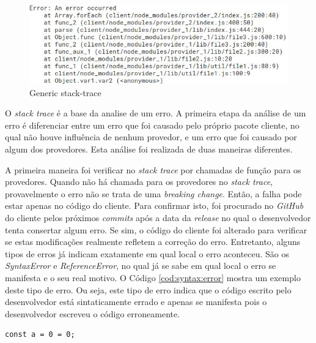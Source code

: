 \begin{figure}
    \centering
    \includegraphics[scale=0.7]{figuras/stack_trace.jpeg}
    \caption{Generic stack-trace}
    \label{fig:trace}
\end{figure}{}

O \textit{stack trace} é a base da analise de um erro. A primeira etapa da análise de um erro é diferenciar entre um erro que foi causado pelo próprio pacote cliente, no qual não houve influência de nenhum provedor, e um erro que foi causado por algum dos provedores. Esta análise foi realizada de duas maneiras diferentes.

A primeira maneira foi verificar no \textit{stack trace} por chamadas de função para os provedores. Quando não há chamada para os provedores no \textit{stack trace}, provavelmente o erro não se trata de uma \textit{breaking change}. Então, a falha pode estar apenas no código do cliente. Para confirmar isto, foi procurado no \textit{GitHub} do cliente pelos próximos \textit{commits} após a data da \textit{release} no qual o desenvolvedor tenta consertar algum erro. Se sim, o código do cliente foi alterado para verificar se estas modificações realmente refletem a correção do erro. Entretanto, alguns tipos de erros já indicam exatamente em qual local o erro aconteceu. São os \textit{SyntaxError} e \textit{ReferenceError}, no qual já se sabe em qual local o erro se manifesta e o seu real motivo. O Código \ref{cod:syntax:error} mostra um exemplo deste tipo de erro. Ou seja, este tipo de erro indica que o código escrito pelo desenvolvedor está sintaticamente errado e apenas se manifesta pois o desenvolvedor escreveu o código erroneamente.

\begin{lstlisting}[style=Javascript, label=cod:syntax:error, caption={Código com um \textit{Reference Error}}]
const a = 0 = 0;
\end{lstlisting}

